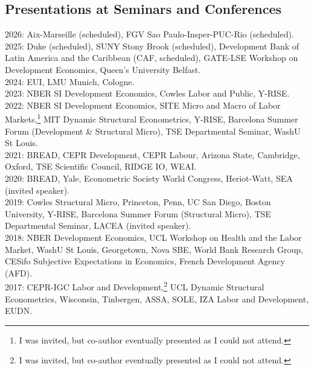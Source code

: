 \documentclass[12pt,english]{article}
\begin{document}
\subsection*{Presentations at Seminars and Conferences}
2026: Aix-Marseille (scheduled), FGV Sao Paulo-Insper-PUC-Rio (scheduled).\vspace{0.2cm} \\
2025: Duke (scheduled), SUNY Stony Brook (scheduled), Development Bank of Latin America and the Caribbean (CAF, scheduled), GATE-LSE Workshop on Development Economics, Queen's University Belfast.\vspace{0.2cm} \\
2024:  EUI, LMU Munich, Cologne. \vspace{0.2cm} \\
2023: NBER SI Development Economics, Cowles Labor and Public, Y-RISE.\vspace{0.2cm} \\
2022: NBER SI Development Economics, SITE Micro and Macro of Labor Markets,\footnote{I was invited, but co-author eventually presented as I could not attend.} MIT Dynamic Structural Econometrics, Y-RISE, Barcelona Summer Forum (Development \& Structural Micro), TSE Departmental Seminar, WashU St Louis.\vspace{0.2cm} \\
2021: BREAD, CEPR Development, CEPR Labour, Arizona State, Cambridge, Oxford, TSE Scientific Council, RIDGE IO, WEAI.\vspace{0.2cm} \\
2020: BREAD, Yale, Econometric Society World Congress, Heriot-Watt, SEA (invited speaker). \vspace{0.2cm} \\
2019:  Cowles Structural Micro, Princeton, Penn, UC San Diego, Boston University, Y-RISE, Barcelona Summer Forum (Structural Micro), TSE Departmental Seminar, LACEA (invited speaker).\vspace{0.2cm} \\
2018: NBER Development Economics, UCL Workshop on Health and the Labor Market, WashU St Louis, Georgetown, Nova SBE, World Bank Research Group, CESifo Subjective Expectations in Economics, French Development Agency (AFD).\vspace{0.2cm} \\
2017: CEPR-IGC Labor and Development,\footnote{I was invited, but co-author eventually presented as I could not attend.} UCL Dynamic Structural Econometrics, Wisconsin, Tinbergen, ASSA, SOLE, IZA Labor and Development, EUDN.\vspace{0.2cm} \\
\end{document}
